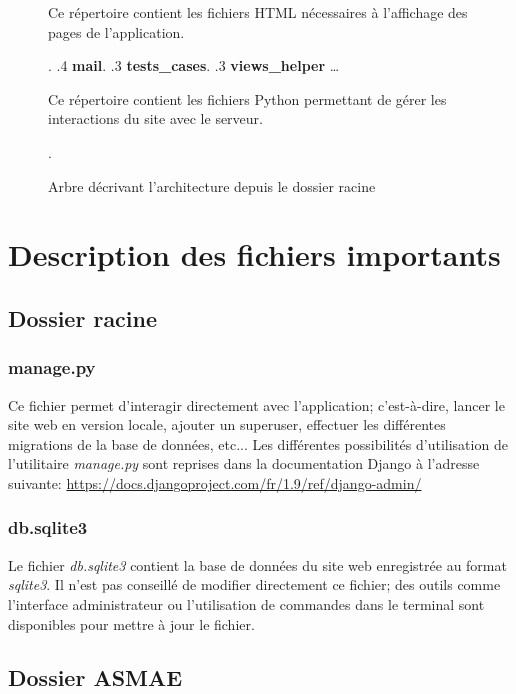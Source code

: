 \begin{figure}[!ht]
\begin{framed}
{\begin{minipage}[t]{10cm}
									Ce répertoire contient les fichiers
									HTML nécessaires à l'affichage des pages
									de l'application{.}
									\end{minipage}.
			.4 \textbf{mail}.
			.3 \textbf{tests\_cases}.
			.3 \textbf{views\_helper} \ldots{} \begin{minipage}[t]{10cm}
									Ce répertoire contient les fichiers
									Python permettant de gérer les interactions
									du site avec le serveur{.}
									\end{minipage}.
		}
	\end{framed}
	\caption{Arbre décrivant l'architecture depuis le dossier racine}
	\label{fig:Architecture des dossiers}
\end{figure}
\FloatBarrier

\section{Description des fichiers importants}

\subsection{Dossier racine}

\subsubsection{manage.py}

Ce fichier permet d'interagir directement avec l'application; c'est-à-dire, lancer le site web en version locale, ajouter un superuser, effectuer les différentes migrations de la base de données, etc... Les différentes possibilités d'utilisation de l'utilitaire \textit{manage.py} sont reprises dans la documentation Django à l'adresse suivante: \url{https://docs.djangoproject.com/fr/1.9/ref/django-admin/}

\subsubsection{db.sqlite3}

Le fichier \textit{db.sqlite3} contient la base de données du site web enregistrée au format \textit{sqlite3}. Il n'est pas conseillé de modifier directement ce fichier; des outils comme l'interface administrateur ou l'utilisation de commandes dans le terminal sont disponibles pour mettre à jour le fichier.

\subsection{Dossier ASMAE}

